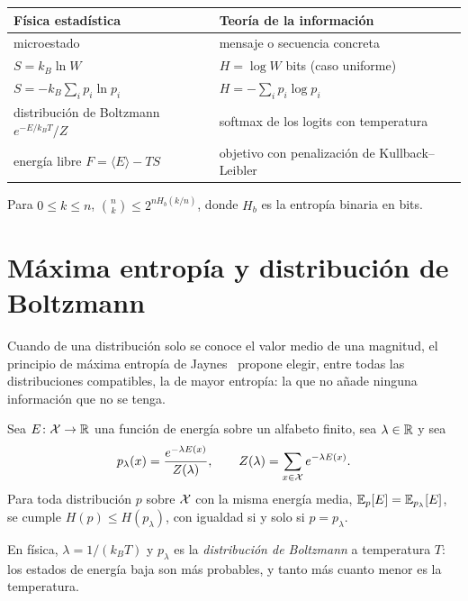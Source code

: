 \begin{center}
\begin{tabular}{@{}ll@{}}
\toprule
Física estadística & Teoría de la información \\
\midrule
microestado & mensaje o secuencia concreta \\
$S=k_B\ln W$ & $H=\log W$ bits (caso uniforme) \\
$S=-k_B\sum_ip_i\ln p_i$ & $H=-\sum_ip_i\log p_i$ \\
distribución de Boltzmann $e^{-E/k_BT}/Z$ & softmax de los logits con temperatura \\
energía libre $F=\langle E\rangle-TS$ & objetivo con penalización de Kullback--Leibler \\
\bottomrule
\end{tabular}
\end{center}

\begin{proposicion}\label{prop:binomial}
Para $0\le k\le n$, $\binom{n}{k}\le 2^{nH_b(k/n)}$, donde $H_b$ es la entropía binaria en bits.
\end{proposicion}

\addtocounter{definicion}{1}%

\section{Máxima entropía y distribución de Boltzmann}

Cuando de una distribución solo se conoce el valor medio de una magnitud, el principio de máxima entropía de Jaynes~\cite{jaynes} propone elegir, entre todas las distribuciones compatibles, la de mayor entropía: la que no añade ninguna información que no se tenga.

\begin{teorema}\label{teo:maxent}
Sea $E\colon\mathcal{X}\to\mathbb{R}$ una función de energía sobre un alfabeto finito, sea $\lambda\in\mathbb{R}$ y sea
\[
p_\lambda(x)=\frac{e^{-\lambda E(x)}}{Z(\lambda)},\qquad Z(\lambda)=\sum_{x\in\mathcal{X}}e^{-\lambda E(x)}.
\]
Para toda distribución $p$ sobre $\mathcal{X}$ con la misma energía media, $\mathbb{E}_p[E]=\mathbb{E}_{p_\lambda}[E]$, se cumple $H(p)\le H(p_\lambda)$, con igualdad si y solo si $p=p_\lambda$.
\end{teorema}

En física, $\lambda=1/(k_BT)$ y $p_\lambda$ es la \emph{distribución de Boltzmann} a temperatura $T$: los estados de energía baja son más probables, y tanto más cuanto menor es la temperatura.

